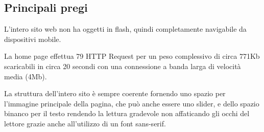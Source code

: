 \documentclass[a4paper,12pt,hidelinks]{report}
\begin{document}
\subsection{Principali pregi}
  L'intero sito web non ha oggetti in flash, quindi completamente navigabile da dispositivi mobile.
  \par La home page effettua 79 HTTP Request per un peso complessivo di circa 771Kb scaricabili in circa 20 secondi con una connessione a banda larga di velocità media (4Mb).
  \par La struttura dell'intero sito è sempre coerente fornendo uno spazio per l'immagine principale della pagina, che può anche essere uno slider, 
  e dello spazio binanco per il testo rendendo la lettura gradevole non affaticando gli occhi del lettore grazie anche all'utilizzo di un font sans-serif.
\end{document}
